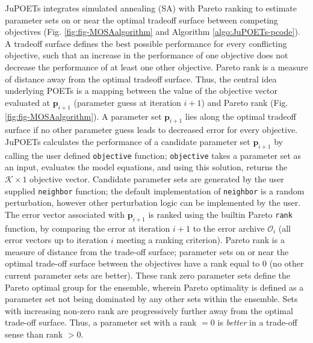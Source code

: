 \documentclass{bmcart}
\begin{document}

JuPOETs integrates simulated annealing (SA) \cite{Kirkpatrick:1983aa} with Pareto ranking to estimate parameter sets on or near the optimal tradeoff surface between competing objectives (Fig. \ref{fig:fig-MOSAalgorithm} and Algorithm \ref{algo:JuPOETs-pcode}).
A tradeoff surface defines the best possible performance for every conflicting objective, such that an increase in the performance of one objective does not decrease the performance of at least one other objective.  Pareto rank is a measure of distance away from the optimal tradeoff surface.
Thus, the central idea underlying POETs is a mapping between the value of the objective vector evaluated at $\mathbf{p}_{i+1}$ (parameter guess at iteration $i+1$) and Pareto rank (Fig. \ref{fig:fig-MOSAalgorithm}).
A parameter set $\mathbf{p}_{i+1}$ lies along the optimal tradeoff surface if no other parameter guess leads to decreased error for every objective.
JuPOETs calculates the performance of a candidate parameter set $\mathbf{p}_{i+1}$ by calling the user defined \texttt{objective} function; \texttt{objective} takes
a parameter set as an input, evaluates the model equations, and using this solution, returns the $\mathcal{K}\times{1}$ objective vector.
Candidate parameter sets are generated by the user supplied \texttt{neighbor} function; the default implementation of \texttt{neighbor} is a random perturbation, however other perturbation logic can be implemented by the user.
The error vector associated with $\mathbf{p}_{i+1}$ is ranked using the builtin Pareto \texttt{rank} function, by comparing the error at iteration $i+1$ to the error archive $\mathcal{O}_{i}$ (all error vectors up to iteration $i$ meeting a ranking criterion). Pareto rank is a measure of distance from the trade-off surface;
parameter sets on or near the optimal trade-off surface between the objectives have a rank equal to $0$ (no other current parameter sets are better).
These rank zero parameter sets define the Pareto optimal group for the ensemble, wherein Pareto optimality is defined as a parameter set not being dominated by any other sets within the ensemble. Sets with increasing non-zero rank are progressively further away from the optimal trade-off surface.
Thus, a parameter set with a rank $=0$ is \emph{better} in a trade-off sense than rank $>0$.
\end{document}
